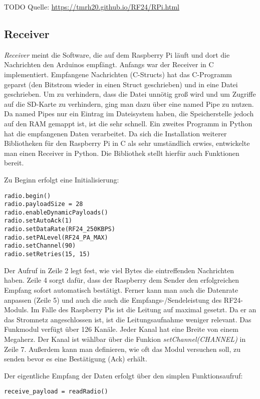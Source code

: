 TODO Quelle: \url{https://tmrh20.github.io/RF24/RPi.html}

\subsection{Receiver}
\label{sec:receiver}
\textit{Receiver} meint die Software, die auf dem Raspberry Pi läuft und dort die Nachrichten den Arduinos empfängt. Anfangs war der Receiver in C implementiert. Empfangene Nachrichten (C-Structs) hat das C-Programm geparst (den Bitstrom wieder in einen Struct geschrieben) und in eine Datei geschrieben. Um zu verhindern, dass die Datei unnötig groß wird und um Zugriffe auf die SD-Karte zu verhindern, ging man dazu über eine named Pipe zu nutzen. Da named Pipes nur ein Eintrag im Dateisystem haben, die Speicherstelle jedoch auf den RAM gemappt ist, ist die sehr schnell. Ein zweites Programm in Python hat die empfangenen Daten verarbeitet. 
Da sich die Installation weiterer Bibliotheken für den Raspberry Pi in C als sehr umständlich erwies, entwickelte man einen Receiver in Python. Die Bibliothek stellt hierfür auch Funktionen bereit. 

Zu Beginn erfolgt eine Initialisierung:
\lstset{language=python, numbers=left}
\begin{lstlisting}
radio.begin()
radio.payloadSize = 28
radio.enableDynamicPayloads()
radio.setAutoAck(1)
radio.setDataRate(RF24_250KBPS)
radio.setPALevel(RF24_PA_MAX)
radio.setChannel(90)
radio.setRetries(15, 15)
\end{lstlisting}
Der Aufruf in Zeile 2 legt fest, wie viel Bytes die eintreffenden Nachrichten haben. Zeile 4 sorgt dafür, dass der Raspberry dem Sender den erfolgreichen Empfang sofort automatisch bestätigt. Ferner kann man auch die Datenrate anpassen (Zeile 5) und auch die auch die Empfangs-/Sendeleistung des RF24-Moduls. Im Falle des Raspberry Pis ist die Leitung auf maximal gesetzt. Da er an das Stromnetz angeschlossen ist, ist die Leitungsaufnahme weniger relevant. Das Funkmodul verfügt über 126 Kanäle. Jeder Kanal hat eine Breite von einem Megaherz. Der Kanal ist wählbar über die Funkion \textit{setChannel(CHANNEL)} in Zeile 7. Außerdem kann man definieren, wie oft das Modul versuchen soll, zu senden bevor es eine Bestätigung (Ack) erhält.

Der eigentliche Empfang der Daten erfolgt über den simplen Funktionsaufruf:
\lstset{language=python, numbers=none}
\begin{lstlisting}
receive_payload = readRadio()
\end{lstlisting}




